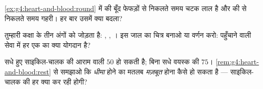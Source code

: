 \begin{exercise}[$\star\star$]\label{exo:g4:heart-and-blood:9}
\cref{ex:g4:heart-and-blood:round} में  की बूँद फेफड़ों से निकलते
समय चटक लाल है और  की  से निकलते समय गहरी। हर बार उसमें क्या
बदला?
\end{exercise}

\begin{exercise}[$\star\star$]\label{exo:g4:heart-and-blood:10}
 तुम्हारी कक्षा के तीन अंगों को जोड़ता है: , , ।
इस जाल का चित्र बनाओ या वर्णन करो: पहुँचाने वाली सेवा में हर एक का क्या
योगदान है?
\end{exercise}

\begin{exercise}[$\star\star\star$]\label{exo:g4:heart-and-blood:11}
सधे हुए साइकिल-चालक की आराम वाली  $50$ हो सकती है; बिना सधे वयस्क
की $75$। \cref{rem:g4:heart-and-blood:rest} से समझाओ कि \emph{धीमा}
होने का मतलब \emph{मज़बूत} होना कैसे हो सकता है --- साइकिल-चालक की हर
 क्या कर रही होगी?
\end{exercise}
